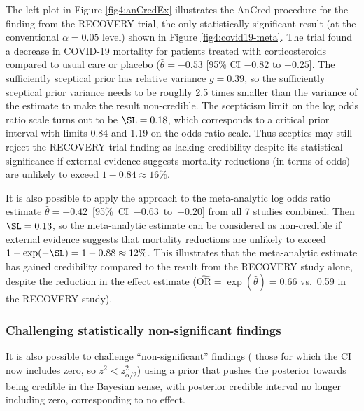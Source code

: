 The left plot in Figure \ref{fig4:anCredEx} illustrates the AnCred procedure for
the finding from the RECOVERY trial, the only statistically significant result
(at the conventional $\alpha=0.05$ level) shown in Figure
\ref{fig4:covid19-meta}. The trial found a decrease in COVID-19 mortality for
patients treated with corticosteroids compared to usual care or placebo
($\hat{\theta} = -0.53$ [95\% CI $-0.82$ to $-0.25$]. The sufficiently sceptical
prior has relative variance $g = 0.39$, so the sufficiently sceptical prior
variance needs to be roughly 2.5 times smaller than the variance of the estimate
to make the result non-credible. The scepticism limit on the log odds ratio
scale turns out to be $\SL=0.18$, which corresponds to a critical prior interval
with limits 0.84 and 1.19 on the odds ratio scale. Thus sceptics may still
reject the RECOVERY trial finding as lacking credibility despite its statistical
significance if external evidence suggests mortality reductions (in terms of
odds) are unlikely to exceed $1 - 0.84 \approx 16 \%$.


It is also possible to apply the approach to the meta-analytic log odds ratio
estimate \mbox{$\hat \theta = -0.42$ [95\% CI $-0.63$ to $-0.20$]} from all 7
studies combined. Then $\SL= 0.13$, so the meta-analytic estimate can be
considered as non-credible if external evidence suggests that mortality
reductions are unlikely to exceed $1-\exp(-\SL)=1 - 0.88 \approx 12 \%$. This
illustrates that the meta-analytic estimate has gained credibility compared to
the result from the \mbox{RECOVERY} study alone, despite the reduction in the
effect estimate ($\widehat{\text{OR}} = \exp(\hat \theta) = 0.66$ vs.~0.59 in
the RECOVERY study).

\subsubsection{Challenging statistically non-significant findings}
\label{sec4:nonSigAnCred}
It is also possible to challenge ``non-significant'' findings (\ie{} those for
which the CI now includes zero, so $z^2 < z_{\alpha/2}^2$) using a prior that
pushes the posterior towards being credible in the Bayesian sense, with
posterior credible interval no longer including zero, corresponding to no
effect.

